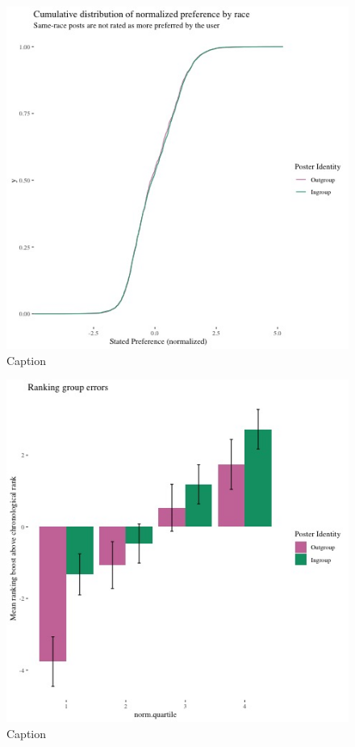 \documentclass[12pt,letterpaper]{article}
\begin{document}
\begin{figure}[h]
    \centering
    \includegraphics[scale=0.5]{Output/Graphs/Audit/Stated preferences/US NF cdf norm preferences by ingroup.jpg}
    \caption{Caption}
    \label{fig:prefcdf}
\end{figure}


\begin{figure}[h]
    \centering
    \includegraphics[scale=0.5]{Output/Graphs/Audit/Misranking relative to expectation/Chronological expectation/US NF by norm preference.jpg}
    \caption{Caption}
    \label{fig:rankabovetime}
\end{figure}
\end{document}
